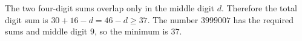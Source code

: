 The two four-digit sums overlap only in the middle digit $d$. Therefore the total digit sum is $30+16-d=46-d\ge37$. The number $3999007$ has the required sums and middle digit $9$, so the minimum is $\boxed{37}$.
